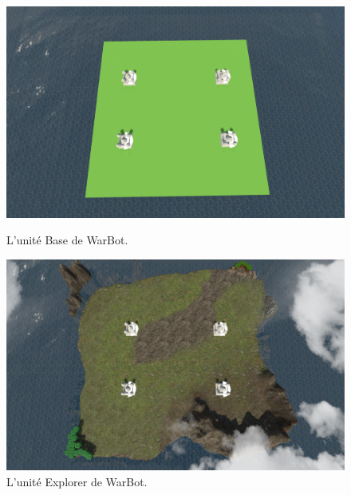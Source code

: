 \documentclass{report}
\begin{document}
\begin{figure}[h]
    \begin{minipage}[c]{.46\linewidth}
        \centering
        \includegraphics[scale=0.25]{MapSimpleImage}
        \caption{L'unité Base de WarBot.}
    \end{minipage}
    \hfill%
    \begin{minipage}[c]{.46\linewidth}
        \centering
        \includegraphics[scale=0.25]{MapMountainImage}
        \caption{L'unité Explorer de WarBot.}
    \end{minipage}
\end{figure}
\end{document}

